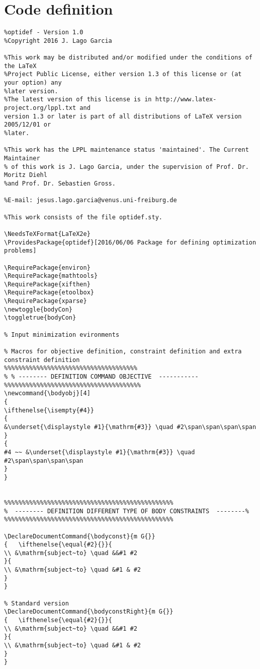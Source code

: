 \documentclass[]{report}
\begin{document}
\section{Code definition}
\begin{verbatim}
%optidef - Version 1.0
%Copyright 2016 J. Lago Garcia

%This work may be distributed and/or modified under the conditions of the LaTeX
%Project Public License, either version 1.3 of this license or (at your option) any 
%later version.
%The latest version of this license is in http://www.latex-project.org/lppl.txt and 
version 1.3 or later is part of all distributions of LaTeX version 2005/12/01 or 
%later.

%This work has the LPPL maintenance status 'maintained'. The Current Maintainer 
% of this work is J. Lago Garcia, under the supervision of Prof. Dr. Moritz Diehl 
%and Prof. Dr. Sebastien Gross.

%E-mail: jesus.lago.garcia@venus.uni-freiburg.de

%This work consists of the file optidef.sty.

\NeedsTeXFormat{LaTeX2e}
\ProvidesPackage{optidef}[2016/06/06 Package for defining optimization problems]

\RequirePackage{environ}
\RequirePackage{mathtools}	
\RequirePackage{xifthen}	
\RequirePackage{etoolbox}	
\RequirePackage{xparse}	
\newtoggle{bodyCon}
\toggletrue{bodyCon}

% Input minimization evironments

% Macros for objective definition, constraint definition and extra constraint definition
%%%%%%%%%%%%%%%%%%%%%%%%%%%%%%%%%%%%%
% % -------- DEFINITION COMMAND OBJECTIVE  -----------
%%%%%%%%%%%%%%%%%%%%%%%%%%%%%%%%%%%%%%
\newcommand{\bodyobj}[4]
{
\ifthenelse{\isempty{#4}}
{
&\underset{\displaystyle #1}{\mathrm{#3}} \quad #2\span\span\span\span
}
{
#4 ~~ &\underset{\displaystyle #1}{\mathrm{#3}} \quad #2\span\span\span\span
}
}


%%%%%%%%%%%%%%%%%%%%%%%%%%%%%%%%%%%%%%%%%%%%%%%
%  -------- DEFINITION DIFFERENT TYPE OF BODY CONSTRAINTS  --------%
%%%%%%%%%%%%%%%%%%%%%%%%%%%%%%%%%%%%%%%%%%%%%%%

\DeclareDocumentCommand{\bodyconst}{m G{}}
{	\ifthenelse{\equal{#2}{}}{
\\ &\mathrm{subject~to} \quad &&#1 #2
}{
\\ &\mathrm{subject~to} \quad &#1 & #2
}
}

% Standard version
\DeclareDocumentCommand{\bodyconstRight}{m G{}}
{	\ifthenelse{\equal{#2}{}}{
\\ &\mathrm{subject~to} \quad &&#1 #2
}{
\\ &\mathrm{subject~to} \quad &#1 & #2
}
}


\end{verbatim}
\end{document}
